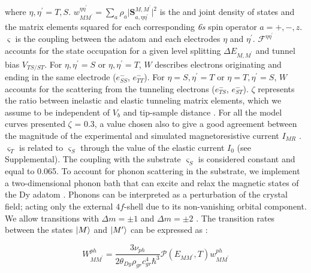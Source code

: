 \documentclass[
reprint,amsmath,amssymb,aps]{revtex4-2}
\begin{document}
where $\eta,\eta^{\prime}=T,S$. $w_{MM^{\prime}}^{\eta \eta^{\prime}} = \sum_{a} \rho_a \lvert {\textbf{S}_{a,\eta\eta^{\prime}}^{M,M^{\prime}}}\rvert^{2}$ is the and joint density of states and the matrix elements squared for each corresponding \textit{6s} spin operator $a = +,-,z$. $\varsigma$ is the coupling between the adatom and each electrodes $\eta$ and $\eta^{\prime}$. $\mathcal{F}^{\eta\eta^{\prime}}$ accounts for the state occupation for a given level splitting $\Delta E_{M,M^{\prime}}$ and tunnel bias $V_{TS/ST}$. For $\eta,\eta^{\prime}=S$ or $\eta,\eta^{\prime}=T$, $W$ describes electrons originating and ending in the same electrode ($e^{-}_{SS}$, $e^{-}_{TT}$). For $\eta = S,\eta^{\prime}=T$ or $\eta = T,\eta^{\prime}=S$, $W$ accounts for the scattering from the tunneling electrons ($e^{-}_{TS}$, $e^{-}_{ST}$). $\zeta$ represents the ratio between inelastic and elastic tunneling matrix elements, which we assume to be independent of $V_b$ and tip-sample distance \cite{fern2009,paul_ControlMillisecondSpin_2017,lorenteEfficientSpinTransitions2009,nussinovNoiseSpectroscopySingle2003}. For all the model curves presented $\zeta$ = 0.3, a value chosen also to give a good agreement between the magnitude of the experimental and simulated magnetoresistive current $I_{MR}$ \cite{delgadoSpinTransferTorqueSingle2010,delgado2010}.
$\varsigma_T$ is related to $\varsigma_S$ through the value of the elastic current $I_0$ (see Supplemental). The coupling with the substrate $\varsigma_S$ is considered constant and equal to 0.065.
To account for phonon scattering in the substrate, we implement a two-dimensional phonon bath that can excite and relax the magnetic states of the Dy adatom \cite{cervetti2016,politi_tunneling_1995}. Phonons can be interpreted as a perturbation of the crystal field; acting only the external $4f$-shell due to its non-vanishing orbital component. We allow transitions with $\Delta m = \pm 1$ and $\Delta m = \pm 2$ \citep{cervetti2016}. The transition rates between the states $\ket{M}$ and $\ket{M^{\prime}}$ can be expressed as \cite{politi_tunneling_1995, cervetti2016}:

\begin{equation}
    \label{eq:phonon_rates}
    W_{MM^{\prime}}^{ph}=\dfrac{3 \nu_{ph}}{2\theta_{Dy}\rho_{gr}c_{gr}^4 \hbar^3} \mathcal{P} \left( E_{MM^{\prime}}, T \right) w^{ph}_{MM^{\prime}}
\end{equation}
\end{document}
